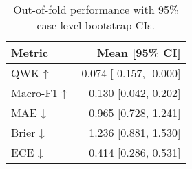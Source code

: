 \begin{table}
\caption{Out-of-fold performance with 95\% case-level bootstrap CIs.}
\label{tab:oof-performance}
\begin{tabular}{lr}
\toprule
Metric & Mean [95\% CI] \\
\midrule
QWK ↑ & -0.074 [-0.157, -0.000] \\
Macro-F1 ↑ & 0.130 [0.042, 0.202] \\
MAE ↓ & 0.965 [0.728, 1.241] \\
Brier ↓ & 1.236 [0.881, 1.530] \\
ECE ↓ & 0.414 [0.286, 0.531] \\
\bottomrule
\end{tabular}
\end{table}
